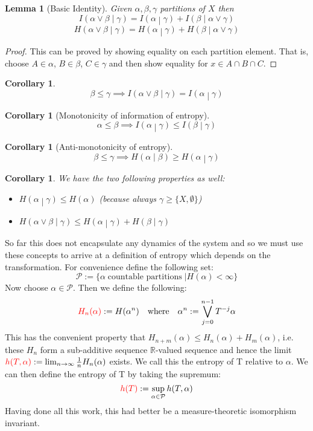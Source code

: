 \documentclass[11pt]{article}
\newcommand{\defeq}{:=}
\newcommand{\relmiddle}[1]{\mathrel{}\middle#1\mathrel{}}
\newcommand{\rmv}{\relmiddle|}
\newcommand{\R}{\mathbb{R}}
\newcommand{\gvn}[2]{\ensuremath{\left(#1\rmv#2\right)}}
\newcommand{\infog}[2]{\ensuremath{I\gvn{#1}{#2}}}
\newcommand{\entrg}[2]{\ensuremath{H\gvn{#1}{#2}}}
\newcommand{\mdf}[1]{{\color{red} #1}}
\newtheorem{lemma}[prop]{Lemma}
\newtheorem{cor}[prop]{Corollary}
\begin{document}
\begin{lemma}[Basic Identity]
	Given $\alpha,\beta,\gamma$ partitions of $X$ then
	$$\infog{\alpha\vee\beta}{\gamma}=\infog{\alpha}{\gamma}+\infog{\beta}{\alpha\vee\gamma}$$
	$$\entrg{\alpha\vee\beta}{\gamma}=\entrg{\alpha}{\gamma}+\entrg{\beta}{\alpha\vee\gamma}$$
\end{lemma}
\begin{proof}
This can be proved by showing equality on each partition element.
That is, choose $A\in \alpha$, $B\in \beta$, $C\in\gamma$ and then show equality for $x\in A \cap B \cap C$.
\end{proof}
\begin{cor}
	$$\beta\leq\gamma\implies\infog{\alpha\vee\beta}{\gamma}=\infog{\alpha}{\gamma}$$
\end{cor}
\begin{cor}[Monotonicity of information of entropy]
	$$\alpha\leq\beta\implies\infog{\alpha}{\gamma}\leq\infog{\beta}{\gamma}$$
\end{cor}
\begin{cor}[Anti-monotonicity of entropy]
	$$\beta\leq\gamma\implies\entrg{\alpha}{\beta}\geq\entrg{\alpha}{\gamma}$$
\end{cor}
\begin{cor}
We have the two following properties as well:
\begin{itemize}
	\item $\entrg{\alpha}{\gamma}\leq H(\alpha)$ (because always $\gamma\geq\{X,\emptyset\}$)
	\item $\entrg{\alpha\vee\beta}{\gamma}\leq\entrg{\alpha}{\gamma}+\entrg{\beta}{\gamma}$
\end{itemize}
\end{cor}
So far this does not encapsulate any dynamics of the system and so we must use these concepts to arrive at a definition of entropy which depends on the transformation. For convenience define the following set:
$$\mathcal{P}\defeq\{\alpha\;\text{countable partitions}\;|H(\alpha) < \infty\}$$
Now choose $\alpha\in\mathcal{P}$. Then we define the following:
$$\mdf{H_n(\alpha)}\defeq H(\alpha^n)\quad\text{where}\quad\alpha^n\defeq\bigvee_{j=0}^{n-1}T^{-j}\alpha$$
This has the convenient property that $H_{n+m}(\alpha)\leq H_n(\alpha)+H_m(\alpha)$, i.e. these $H_n$ form a sub-additive sequence $\R$-valued sequence and hence the limit $\mdf{h(T,\alpha)}\defeq\lim_{n\to\infty}\frac{1}{n}H_n(\alpha)$ exists. We call this the \mdf{entropy of T relative to $\alpha$}.
We can then define the \mdf{entropy of T} by taking the supremum:
$$\mdf{h(T)}\defeq\sup_{\alpha\in\mathcal{P}}h(T,\alpha)$$
Having done all this work, this had better be a measure-theoretic isomorphism invariant.
\end{document}
